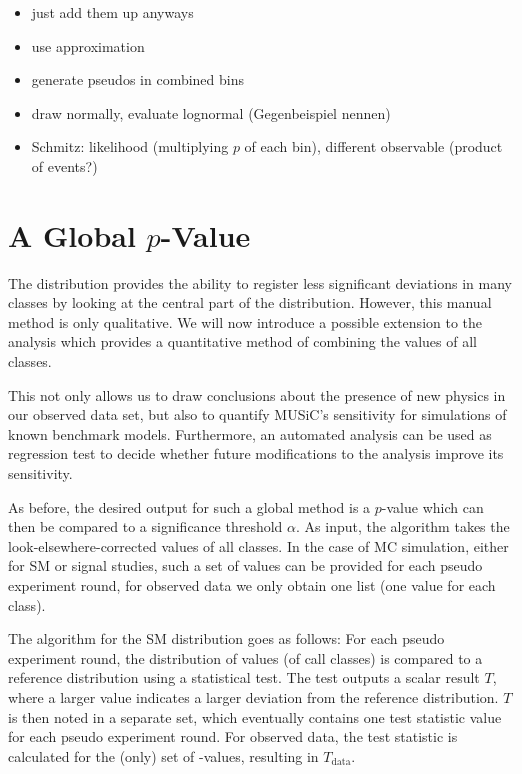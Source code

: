 \begin{itemize}
    \item just add them up anyways
    \item use approximation \cite{Mehta:ApproximatingSumCorrelated}
    \item generate pseudos in combined bins
    \item draw normally, evaluate lognormal (Gegenbeispiel nennen) 
    \item Schmitz: likelihood (multiplying $p$ of each bin), different observable (product of events?)
\end{itemize}




\section{A Global $p$-Value}
\label{sec:global_pvalue}

\newcommand{\TSphat}{\ensuremath{T}\xspace}

The \ptilde distribution provides the ability to register less significant deviations in many classes by looking at the central part of the distribution. However, this manual method is only qualitative. We will now introduce a possible extension to the analysis which provides a quantitative method of combining the \ptilde values of all classes.

This not only allows us to draw conclusions about the presence of new physics in our observed data set, but also to quantify \ac{MUSiC}'s sensitivity for simulations of known benchmark models. Furthermore, an automated analysis can be used as regression test to decide whether future modifications to the analysis improve its sensitivity.

As before, the desired output for such a global method is a $p$-value which can then be compared to a significance threshold $\alpha$.
As input, the algorithm takes the look-elsewhere-corrected \ptilde values of all classes. In the case of \ac{MC} simulation, either for \ac{SM} or signal studies, such a set of \ptilde values can be provided for each pseudo experiment round, for observed data we only obtain one list (one value for each class).

The algorithm for the \ac{SM} distribution goes as follows: For each pseudo experiment round, the distribution of \ptilde values (of call classes) is compared to a reference distribution using a statistical test. The test outputs a scalar result \TSphat, where a larger value indicates a larger deviation from the reference distribution. \TSphat is then noted in a separate set, which eventually contains one test statistic value for each pseudo experiment round.
For observed data, the test statistic is calculated for the (only) set of \ptilde-values, resulting in $\TSphat_\text{data}$.

